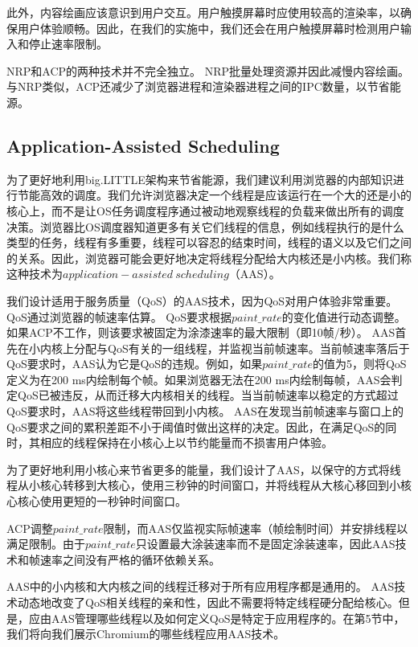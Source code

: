 \documentclass{sig-alternate-05-2015}
\begin{document}
此外，内容绘画应该意识到用户交互。用户触摸屏幕时应使用较高的渲染率，以确保用户体验顺畅。因此，在我们的实施中，我们还会在用户触摸屏幕时检测用户输入和停止速率限制。

NRP和ACP的两种技术并不完全独立。 NRP批量处理资源并因此减慢内容绘画。与NRP类似，ACP还减少了浏览器进程和渲染器进程之间的IPC数量，以节省能源。


\subsection{Application-Assisted Scheduling}

为了更好地利用big.LITTLE架构来节省能源，我们建议利用浏览器的内部知识进行节能高效的调度。我们允许浏览器决定一个线程是应该运行在一个大的还是小的核心上，而不是让OS任务调度程序通过被动地观察线程的负载来做出所有的调度决策。浏览器比OS调度器知道更多有关它们线程的信息，例如线程执行的是什么类型的任务，线程有多重要，线程可以容忍的结束时间，线程的语义以及它们之间的关系。因此，浏览器可能会更好地决定将线程分配给大内核还是小内核。我们称这种技术为$application-assisted\ scheduling$（AAS）\cite{1}。

我们设计适用于服务质量（QoS）的AAS技术，因为QoS对用户体验非常重要。 QoS通过浏览器的帧速率估算。 QoS要求根据$paint\_rate$的变化值进行动态调整。如果ACP不工作，则该要求被固定为涂漆速率的最大限制（即10帧/秒）。 AAS首先在小内核上分配与QoS有关的一组线程，并监视当前帧速率。当前帧速率落后于QoS要求时，AAS认为它是QoS的违规。例如，如果$paint\_rate$的值为5，则将QoS定义为在200 ms内绘制每个帧。如果浏览器无法在200 ms内绘制每帧，AAS会判定QoS已被违反，从而迁移大内核相关的线程。当当前帧速率以稳定的方式超过QoS要求时，AAS将这些线程带回到小内核。 AAS在发现当前帧速率与窗口上的QoS要求之间的累积差距不小于阈值时做出这样的决定。因此，在满足QoS的同时，其相应的线程保持在小核心上以节约能量而不损害用户体验。

为了更好地利用小核心来节省更多的能量，我们设计了AAS，以保守的方式将线程从小核心转移到大核心，使用三秒钟的时间窗口，并将线程从大核心移回到小核心核心使用更短的一秒钟时间窗口。

ACP调整$paint\_rate$限制，而AAS仅监视实际帧速率（帧绘制时间）并安排线程以满足限制。由于$paint\_rate$只设置最大涂装速率而不是固定涂装速率，因此AAS技术和帧速率之间没有严格的循环依赖关系。

AAS中的小内核和大内核之间的线程迁移对于所有应用程序都是通用的。 AAS技术动态地改变了QoS相关线程的亲和性，因此不需要将特定线程硬分配给核心。但是，应由AAS管理哪些线程以及如何定义QoS是特定于应用程序的。在第5节中，我们将向我们展示Chromium的哪些线程应用AAS技术。
\end{document}
